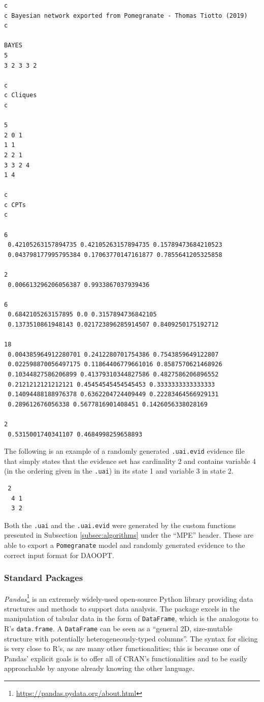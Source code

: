\begin{mdframed}
\begin{verbatim}
c
c Bayesian network exported from Pomegranate - Thomas Tiotto (2019)
c

BAYES
5
3 2 3 3 2 

c
c Cliques
c

5
2 0 1 
1 1 
2 2 1 
3 3 2 4 
1 4 

c
c CPTs
c

6
 0.42105263157894735 0.42105263157894735 0.15789473684210523 
 0.043798177995795384 0.17063770147161877 0.7855641205325858 

2
 0.006613296206056387 0.9933867037939436 

6
 0.6842105263157895 0.0 0.3157894736842105 
 0.1373510861948143 0.021723896285914507 0.8409250175192712 

18
 0.004385964912280701 0.2412280701754386 0.7543859649122807 
 0.022598870056497175 0.11864406779661016 0.8587570621468926 
 0.10344827586206899 0.41379310344827586 0.4827586206896552 
 0.2121212121212121 0.45454545454545453 0.3333333333333333 
 0.14094488188976378 0.6362204724409449 0.22283464566929131 
 0.289612676056338 0.5677816901408451 0.1426056338028169 

2
 0.5315001740341107 0.4684998259658893 
\end{verbatim}
\end{mdframed}

The following is an example of a randomly generated \texttt{.uai.evid} evidence file that simply states that the evidence set has cardinality 2 and contains variable 4 (in the ordering given in the \texttt{.uai}) in its state 1 and variable 3 in state 2.

\begin{mdframed}
\begin{verbatim}
 2
  4 1
  3 2
\end{verbatim}
\end{mdframed}

Both the \texttt{.uai} and the \texttt{.uai.evid} were generated by the custom functions presented in Subsection \ref{subsec:algorithms} under the \enquote{MPE} header.
These are able to export a \texttt{Pomegranate} model and randomly generated evidence to the correct input format for DAOOPT.

\subsubsection{Standard Packages}
\textit{Pandas}\footnote{\url{https://pandas.pydata.org/about.html}} is an extremely widely-used open-source Python library providing data structures and methods to support data analysis.
The package excels in the manipulation of tabular data in the form of \texttt{DataFrame}, which is the analogous to R's \texttt{data.frame}.
A \texttt{DataFrame} can be seen as a \enquote{general 2D, size-mutable structure with potentially heterogeneously-typed columns}.
The syntax for slicing is very close to R's, as are many other functionalities; this is because one of Pandas' explicit goals is to offer all of CRAN's functionalities and to be easily approachable by anyone already knowing the other language.


